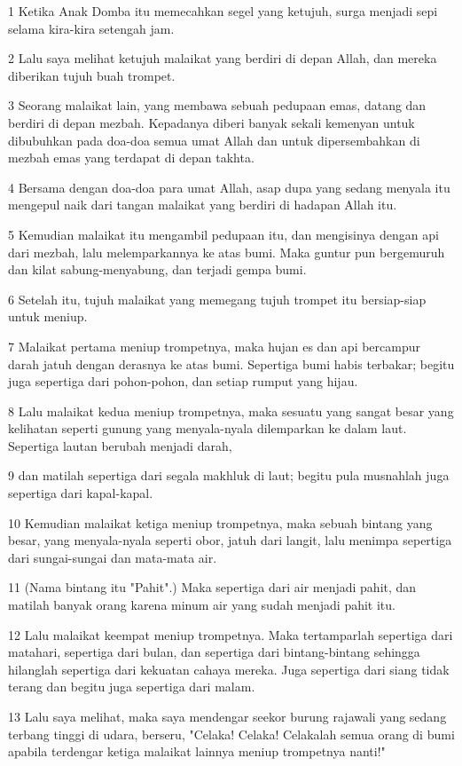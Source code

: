 \par 1 Ketika Anak Domba itu memecahkan segel yang ketujuh, surga menjadi sepi selama kira-kira setengah jam.
\par 2 Lalu saya melihat ketujuh malaikat yang berdiri di depan Allah, dan mereka diberikan tujuh buah trompet.
\par 3 Seorang malaikat lain, yang membawa sebuah pedupaan emas, datang dan berdiri di depan mezbah. Kepadanya diberi banyak sekali kemenyan untuk dibubuhkan pada doa-doa semua umat Allah dan untuk dipersembahkan di mezbah emas yang terdapat di depan takhta.
\par 4 Bersama dengan doa-doa para umat Allah, asap dupa yang sedang menyala itu mengepul naik dari tangan malaikat yang berdiri di hadapan Allah itu.
\par 5 Kemudian malaikat itu mengambil pedupaan itu, dan mengisinya dengan api dari mezbah, lalu melemparkannya ke atas bumi. Maka guntur pun bergemuruh dan kilat sabung-menyabung, dan terjadi gempa bumi.
\par 6 Setelah itu, tujuh malaikat yang memegang tujuh trompet itu bersiap-siap untuk meniup.
\par 7 Malaikat pertama meniup trompetnya, maka hujan es dan api bercampur darah jatuh dengan derasnya ke atas bumi. Sepertiga bumi habis terbakar; begitu juga sepertiga dari pohon-pohon, dan setiap rumput yang hijau.
\par 8 Lalu malaikat kedua meniup trompetnya, maka sesuatu yang sangat besar yang kelihatan seperti gunung yang menyala-nyala dilemparkan ke dalam laut. Sepertiga lautan berubah menjadi darah,
\par 9 dan matilah sepertiga dari segala makhluk di laut; begitu pula musnahlah juga sepertiga dari kapal-kapal.
\par 10 Kemudian malaikat ketiga meniup trompetnya, maka sebuah bintang yang besar, yang menyala-nyala seperti obor, jatuh dari langit, lalu menimpa sepertiga dari sungai-sungai dan mata-mata air.
\par 11 (Nama bintang itu "Pahit".) Maka sepertiga dari air menjadi pahit, dan matilah banyak orang karena minum air yang sudah menjadi pahit itu.
\par 12 Lalu malaikat keempat meniup trompetnya. Maka tertamparlah sepertiga dari matahari, sepertiga dari bulan, dan sepertiga dari bintang-bintang sehingga hilanglah sepertiga dari kekuatan cahaya mereka. Juga sepertiga dari siang tidak terang dan begitu juga sepertiga dari malam.
\par 13 Lalu saya melihat, maka saya mendengar seekor burung rajawali yang sedang terbang tinggi di udara, berseru, "Celaka! Celaka! Celakalah semua orang di bumi apabila terdengar ketiga malaikat lainnya meniup trompetnya nanti!"

